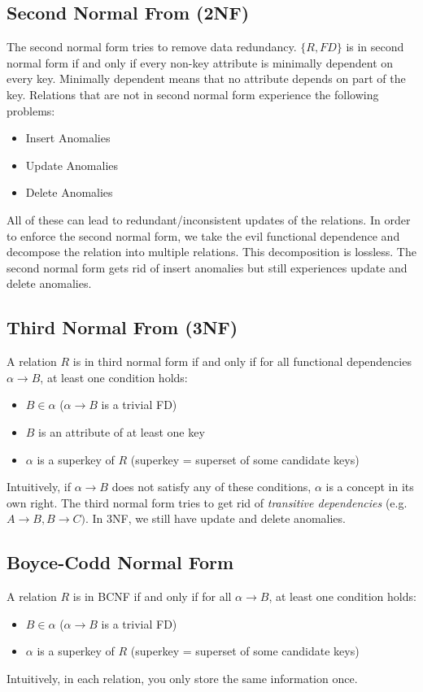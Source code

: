 \subsection{Second Normal From (2NF)}
The second normal form tries to remove data redundancy. $\{R, FD\}$ is in second normal form if and only if every non-key attribute is minimally dependent on every key. Minimally dependent means that no attribute depends on part of the key. Relations that are not in second normal form experience the following problems:
\begin{itemize}
\item Insert Anomalies
\item Update Anomalies
\item Delete Anomalies
\end{itemize}
All of these can lead to redundant/inconsistent updates of the relations. In order to enforce the second normal form, we take the evil functional dependence and decompose the relation into multiple relations. This decomposition is lossless. The second normal form gets rid of insert anomalies but still experiences update and delete anomalies.

\subsection{Third Normal From (3NF)}
A relation $R$ is in third normal form if and only if for all functional dependencies $\alpha \to B$, at least one condition holds:
\begin{itemize}
\item $B \in \alpha$ ($\alpha \to B$ is a trivial FD)
\item $B$ is an attribute of at least one key
\item $\alpha$ is a superkey of $R$ (superkey = superset of some candidate keys)
\end{itemize}
Intuitively, if $\alpha \to B$ does not satisfy any of these conditions, $\alpha$ is a concept in its own right. The third normal form tries to get rid of \textit{transitive dependencies} (e.g. $A \to B ,B \to C)$. In 3NF, we still have update and delete anomalies.

\subsection{Boyce-Codd Normal Form}
A relation $R$ is in BCNF if and only if for all $\alpha \to B$, at least one condition holds:
\begin{itemize}
\item $B \in \alpha$ ($\alpha \to B$ is a trivial FD)
\item $\alpha$ is a superkey of $R$ (superkey = superset of some candidate keys)
\end{itemize}
Intuitively, in each relation, you only store the same information once.


